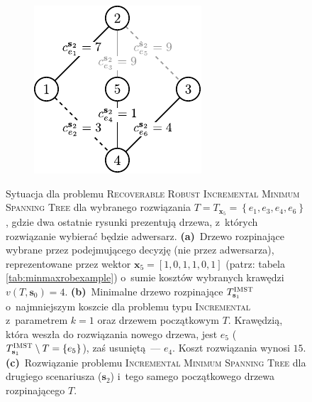 \begin{figure}[!htbp]
\begin{subfigure}[b]{0.3\textwidth}
		\caption{}
		\label{fig:robincrexample:b}
	\end{subfigure}
	\hfill
	\begin{subfigure}[b]{0.3\textwidth}
		\includegraphics[width=\textwidth]{Chapter_II/ROB-INC-MST-example/c1}
		\caption{}
		\label{fig:robincrexample:c}
	\end{subfigure}
	\hfill\null
	\caption{
		Sytuacja dla problemu \textsc{Recoverable Robust Incremental Minimum Spanning Tree} dla wybranego rozwiązania $T = T_{\textbf{x}_{5}} = \left\{ e_{1}, e_{3}, e_{4}, e_{6} \right\}$, gdzie dwa ostatnie rysunki prezentują drzewa, z~których rozwiązanie wybierać będzie adwersarz.
		\textbf{(a)}~Drzewo rozpinające wybrane przez podejmującego decyzję (nie przez adwersarza), reprezentowane przez wektor $\textbf{x}_{5} = \left[ 1, 0, 1, 1, 0, 1 \right]$ (patrz: tabela \ref{tab:minmaxrobexample}) o~sumie kosztów wybranych krawędzi $v \left( T, \textbf{s}_{0} \right) = 4$.
		\textbf{(b)}~Minimalne drzewo rozpinające $T^{\textsc{IMST}}_{\textbf{s}_{1}}$ o~najmniejszym koszcie dla problemu typu \textsc{Incremental} z~parametrem $k = 1$ oraz drzewem początkowym $T$.
		Krawędzią, która weszła do rozwiązania nowego drzewa, jest $e_{5}$ ($T^{\textsc{IMST}}_{\textbf{s}_{1}} \setminus T = \left\{ e_{5} \right\}$), zaś usuniętą~--- $e_{4}$.
		Koszt rozwiązania wynosi $15$.
		\textbf{(c)}~Rozwiązanie problemu \textsc{Incremental Minimum Spanning Tree} dla drugiego scenariusza ($\textbf{s}_{2}$) i~tego samego początkowego drzewa rozpinającego $T$.
}
\end{figure}
